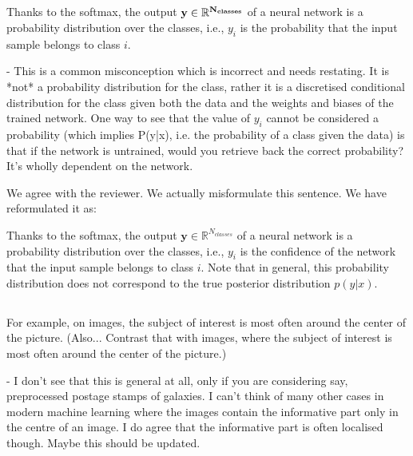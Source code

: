 \documentclass[12pt,a4paper]{article}
\newcommand{\nati}[1]{{\color[rgb]{.1,.6,.1}{NP: #1}}}
\newcommand{\todo}[1]{{\color[rgb]{.6,.1,.6}{TODO: #1}}}
\renewcommand{\b}[1]{{\bm{#1}}}   %
\newcommand{\1}{\b{1}}              %
\newcommand{\0}{\b{0}}              %
\newcommand{\y}{\b{y}}
\newcommand{\R}{\mathbb{R}}
\begin{document}
\subsection{}
\begin{mdframed}[style=comment] 
Thanks to the softmax, the output $\bf{y}\in\mathbb{R}^{N_{classes}}$ of a neural network is a probability distribution over the classes, i.e., $y_i$ is the probability that the input sample belongs to class $i$.

- This is a common misconception which is incorrect and needs restating. It is *not* a probability distribution for the class, rather it is a discretised conditional distribution for the class given both the data and the weights and biases of the trained network. One way to see that the value of $y_i$ cannot be considered a probability (which implies P(y|x), i.e. the probability of a class given the data) is that if the network is untrained, would you retrieve back the correct probability? It's wholly dependent on the network.
\end{mdframed}

We agree with the reviewer. We actually misformulate this sentence. We have reformulated it as:
\begin{mdframed}[style=manuscript] 
Thanks to the softmax, the output $\y \in \R^{N_{classes}}$ of a neural network is a probability distribution over the classes, i.e., $y_i$ is the confidence of the network that the input sample belongs to class $i$. Note that in general, this probability distribution does not correspond to the true posterior distribution $p(y|x)$.
\end{mdframed}

\nati{By the way, this mean that the reviewer is knowledgable with ML, and may be Bayesian. He might be working on another spherical approach.}

\subsection{}
\begin{mdframed}[style=comment] 
For example, on images, the subject of interest is most often around the center of the picture. (Also... Contrast that with images, where the subject of interest is most often around the center of the picture.)

- I don't see that this is general at all, only if you are considering say, preprocessed postage stamps of galaxies. I can't think of many other cases in modern machine learning where the images contain the informative part only in the centre of an image. I do agree that the informative part is often localised though. Maybe this should be updated. 
\end{mdframed}
\todo{Assigned: @michael}
\end{document}
